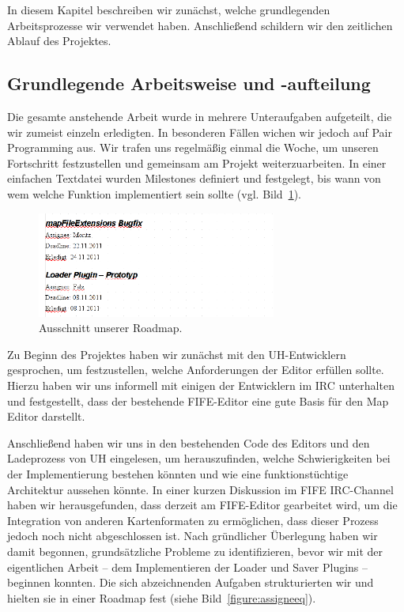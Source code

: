 In diesem Kapitel beschreiben wir zunächst, welche grundlegenden Arbeitsprozesse
wir verwendet haben. Anschließend schildern wir den zeitlichen Ablauf des
Projektes.

\subsection{Grundlegende Arbeitsweise und -aufteilung}
Die gesamte anstehende Arbeit wurde in mehrere Unteraufgaben aufgeteilt, die wir
zumeist einzeln erledigten.
In besonderen Fällen wichen wir jedoch auf Pair Programming aus. Wir trafen uns
regelmäßig einmal die Woche, um unseren Fortschritt festzustellen und gemeinsam
am Projekt weiterzuarbeiten. In einer einfachen Textdatei wurden Milestones
definiert und festgelegt, bis wann von wem welche Funktion implementiert sein
sollte (vgl. Bild~\ref{figure:assignee}).

\begin{figure}[htbp]
  \centering

    \includegraphics[width=0.7\textwidth]{gfx/assignee.png}

  \caption{Ausschnitt unserer Roadmap.}
  \label{figure:assignee}
\end{figure}

Zu Beginn des Projektes haben wir zunächst mit den UH-Entwicklern gesprochen,
um festzustellen, welche Anforderungen der Editor erfüllen sollte. Hierzu
haben wir uns informell mit einigen der Entwicklern im IRC unterhalten und
festgestellt, dass der bestehende FIFE-Editor eine gute Basis für den Map
Editor darstellt.

Anschließend haben wir uns in den bestehenden Code des Editors und den
Ladeprozess von UH eingelesen, um herauszufinden, welche Schwierigkeiten bei der
Implementierung bestehen könnten und wie eine funktionstüchtige Architektur
aussehen könnte.
In einer kurzen Diskussion im FIFE IRC-Channel haben wir herausgefunden, dass
derzeit am FIFE-Editor gearbeitet wird, um die Integration von anderen
Kartenformaten zu ermöglichen, dass dieser Prozess jedoch noch nicht
abgeschlossen ist. Nach gründlicher Überlegung haben wir damit begonnen,
grundsätzliche Probleme zu identifizieren, bevor wir mit der eigentlichen Arbeit
-- dem Implementieren der Loader und Saver Plugins -- beginnen konnten. Die sich
abzeichnenden Aufgaben strukturierten wir und hielten sie in einer Roadmap fest
(siehe Bild~\ref{figure:assigneeq}).

